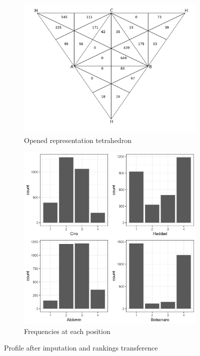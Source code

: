 \documentclass[hidelinks,11pt]{article}
\begin{document}
\begin{figure}[!h] \centering
  \begin{subfigure}[b]{0.49\textwidth} \centering
\includegraphics[width=\textwidth]{./images/representation_tetrahedron.png}
 \caption{Opened representation tetrahedron}
 \label{fig:rep_ot}
\end{subfigure} \hfill
  \begin{subfigure}[b]{0.49\textwidth} \centering
\includegraphics[width=\textwidth]{./images/corrected1_indexes_plot.png}
 \caption{Frequencies at each position}
 \label{fig:counts}
\end{subfigure}
\caption{Profile after imputation and rankings transference}
\label{fig:profile_trans}
\end{figure}
\end{document}
